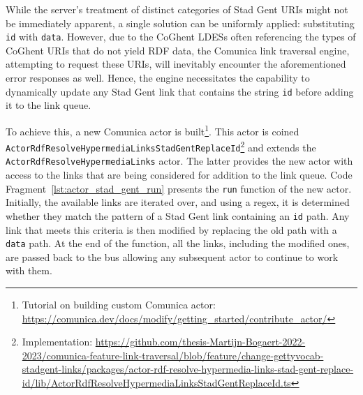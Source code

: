 While the server's treatment of distinct categories of Stad Gent URIs might not be immediately apparent, a single solution can be uniformly applied: substituting \texttt{id} with \texttt{data}. However, due to the CoGhent LDESs often referencing the types of CoGhent URIs that do not yield RDF data, the Comunica link traversal engine, attempting to request these URIs, will inevitably encounter the aforementioned error responses as well. Hence, the engine necessitates the capability to dynamically update any Stad Gent link that contains the string \texttt{id} before adding it to the link queue.

To achieve this, a new Comunica actor is built\footnote{Tutorial on building custom Comunica actor: \url{https://comunica.dev/docs/modify/getting_started/contribute_actor/}}. This actor is coined \linebreak\texttt{ActorRdfResolveHypermediaLinksStadGentReplaceId}\footnote{Implementation: \url{https://github.com/thesis-Martijn-Bogaert-2022-2023/comunica-feature-link-traversal/blob/feature/change-gettyvocab-stadgent-links/packages/actor-rdf-resolve-hypermedia-links-stad-gent-replace-id/lib/ActorRdfResolveHypermediaLinksStadGentReplaceId.ts}} and extends the \linebreak\texttt{ActorRdfResolveHypermediaLinks} actor. The latter provides the new actor with access to the links that are being considered for addition to the link queue. Code Fragment~\ref{lst:actor_stad_gent_run} presents the \texttt{run} function of the new actor. Initially, the available links are iterated over, and using a regex, it is determined whether they match the pattern of a Stad Gent link containing an \texttt{id} path. Any link that meets this criteria is then modified by replacing the old path with a \texttt{data} path. At the end of the function, all the links, including the modified ones, are passed back to the bus allowing any subsequent actor to continue to work with them.

